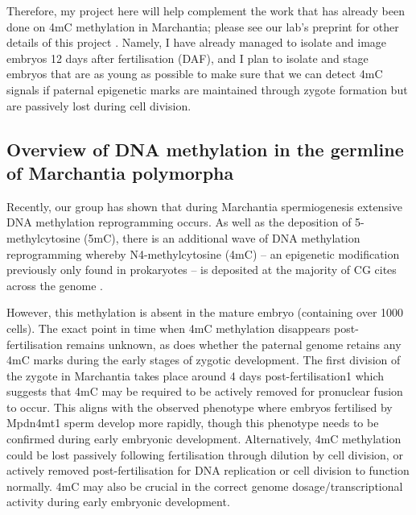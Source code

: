 Therefore, my project here will help complement the work that has already been done on 4mC methylation in Marchantia; please see our lab’s preprint for other details of this project \citep{RN189}. Namely, I have already managed to isolate and image embryos 12 days after fertilisation (DAF), and I plan to isolate and stage embryos that are as young as possible to make sure that we can detect 4mC signals if paternal epigenetic marks are maintained through zygote formation but are passively lost during cell division.

\subsection{Overview of DNA methylation in the germline of Marchantia polymorpha}

Recently, our group has shown that during Marchantia spermiogenesis extensive DNA methylation reprogramming occurs. As well as the deposition of 5-methylcytosine (5mC), there is an additional wave of DNA methylation reprogramming whereby N4-methylcytosine (4mC) – an epigenetic modification previously only found in prokaryotes – is deposited at the majority of CG cites across the genome \citep{RN189}.

However, this methylation is absent in the mature embryo (containing over 1000 cells). The exact point in time when 4mC methylation disappears post-fertilisation remains unknown, as does whether the paternal genome retains any 4mC marks during the early stages of zygotic development. The first division of the zygote in Marchantia takes place around 4 days post-fertilisation1 which suggests that 4mC may be required to be actively removed for pronuclear fusion to occur. This aligns with the observed phenotype where embryos fertilised by Mpdn4mt1 sperm develop more rapidly, though this phenotype needs to be confirmed during early embryonic development. Alternatively, 4mC methylation could be lost passively following fertilisation through dilution by cell division, or actively removed post-fertilisation for DNA replication or cell division to function normally. 4mC may also be crucial in the correct genome dosage/transcriptional activity during early embryonic development. 

